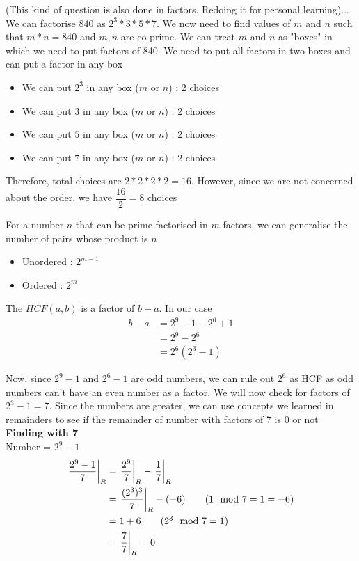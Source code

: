 (This kind of question is also done in factors. Redoing it for personal learning)... We can factorise 840 as $2^3 * 3 * 5 * 7$. We now need to find values of $m$ and $n$ such that $m * n = 840$ and $m,n$ are co-prime. We can treat $m$ and $n$ as "boxes" in which we need to put factors of 840. We need to put all factors in two boxes and can put a factor in any box

\begin{itemize}
    \item We can put $2^3$ in any box ($m$ or $n$) : 2 choices
    \item We can put $3$ in any box ($m$ or $n$) : 2 choices
    \item We can put $5$ in any box ($m$ or $n$) : 2 choices
    \item We can put $7$ in any box ($m$ or $n$) : 2 choices
\end{itemize}

Therefore, total choices are $2 * 2 * 2 * 2 = 16$. However, since we are not concerned about the order, we have $\dfrac{16}{2} = 8$ choices

\begin{EXTRA-LEARNING}
    For a number $n$ that can be prime factorised in $m$ factors, we can generalise the number of pairs whose product is $n$
    \begin{itemize}
        \item Unordered : $2^{m-1}$
        \item Ordered : $2^m$
    \end{itemize}
\end{EXTRA-LEARNING}

The $HCF(a,b)$ is a factor of $b-a$. In our case
\begin{align*}
    b - a &= 2^9 - 1 - 2^6 + 1 \\
    &= 2^9 - 2^6 \\
    &= 2^6 (2^3 - 1)
\end{align*}

Now, since $2^9 - 1$ and $2^6 - 1$ are odd numbers, we can rule out $2^6$ as HCF as odd numbers can't have an even number as a factor. We will now check for factors of $2^3 - 1 = 7$. Since the numbers are greater, we can use concepts we learned in remainders to see if the remainder of number with factors of 7 is 0 or not \\

\textbf{Finding with 7} \\
Number = $2^9 - 1$ 
\begin{align*}
    \displaystyle{ \left. \frac{2^9 - 1}{7} \right |_{R} } &= \displaystyle{ \left. \frac{2^9}{7} \right |_{R} } - \displaystyle{ \left. \frac{1}{7} \right |_{R} } \\
    &= \displaystyle{ \left. \frac{(2^3)^3}{7} \right |_{R} } - (-6) \tag{$1 \mod 7 = 1 = -6$} \\
    &= 1 + 6 \tag{$2^3 \mod 7 = 1$} \\
    &= \displaystyle{ \left. \frac{7}{7} \right |_{R} } = 0
\end{align*}

